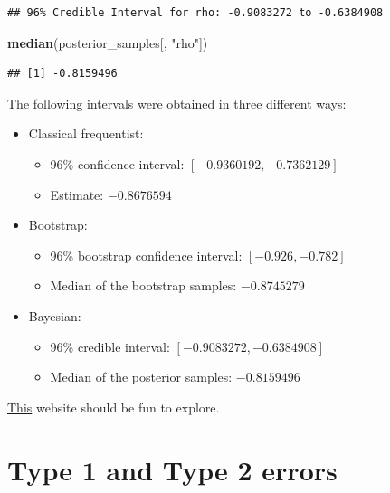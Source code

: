\documentclass[
]{book}
\newenvironment{Shaded}{\begin{snugshade}}{\end{snugshade}}
\newcommand{\FunctionTok}[1]{\textcolor[rgb]{0.13,0.29,0.53}{\textbf{#1}}}
\newcommand{\NormalTok}[1]{#1}
\newcommand{\StringTok}[1]{\textcolor[rgb]{0.31,0.60,0.02}{#1}}
\providecommand{\tightlist}{%
  \setlength{\itemsep}{0pt}\setlength{\parskip}{0pt}}
\begin{document}
\begin{verbatim}
## 96% Credible Interval for rho: -0.9083272 to -0.6384908
\end{verbatim}

\begin{Shaded}
\begin{Highlighting}[]
\FunctionTok{median}\NormalTok{(posterior\_samples[, }\StringTok{"rho"}\NormalTok{])}
\end{Highlighting}
\end{Shaded}

\begin{verbatim}
## [1] -0.8159496
\end{verbatim}

The following intervals were obtained in three different ways:

\begin{itemize}
\tightlist
\item
  Classical frequentist:

  \begin{itemize}
  \tightlist
  \item
    96\% confidence interval: \([-0.9360192, -0.7362129]\)
  \item
    Estimate: \(-0.8676594\)
  \end{itemize}
\item
  Bootstrap:

  \begin{itemize}
  \tightlist
  \item
    96\% bootstrap confidence interval: \([-0.926, -0.782]\)
  \item
    Median of the bootstrap samples: \(-0.8745279\)
  \end{itemize}
\item
  Bayesian:

  \begin{itemize}
  \tightlist
  \item
    96\% credible interval: \([-0.9083272, -0.6384908]\)
  \item
    Median of the posterior samples: \(-0.8159496\)
  \end{itemize}
\end{itemize}

\href{https://seeing-theory.brown.edu/frequentist-inference/index.html}{This}
website should be fun to explore.

\section{Type 1 and Type 2 errors}\label{error_types}
\end{document}
